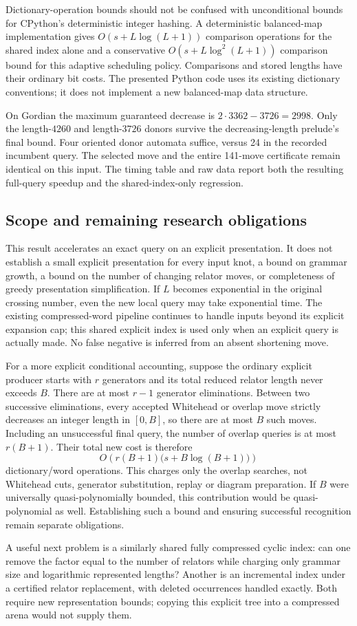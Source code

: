 Dictionary-operation bounds should not be confused with unconditional
bounds for CPython's deterministic integer hashing.  A deterministic
balanced-map implementation gives $O(s+L\log(L+1))$ comparison operations
for the shared index alone and a conservative
$O(s+L\log^2(L+1))$ comparison bound for this adaptive scheduling policy.
Comparisons and stored lengths have their ordinary bit costs.  The
presented Python code uses its existing dictionary conventions; it does
not implement a new balanced-map data structure.

On Gordian the maximum guaranteed decrease is $2\cdot3362-3726=2998$.
Only the length-$4260$ and length-$3726$ donors survive the decreasing-length
prelude's final bound.  Four oriented donor automata suffice, versus 24
in the recorded incumbent query.  The selected move and the entire
141-move certificate remain identical on this input.  The timing table
and raw data report both the resulting full-query speedup and the
shared-index-only regression.

\subsection{Scope and remaining research obligations}

This result accelerates an exact query on an explicit presentation.  It
does not establish a small explicit presentation for every input knot,
a bound on grammar growth, a bound on the number of changing relator
moves, or completeness of greedy presentation simplification.  If $L$
becomes exponential in the original crossing number, even the new local
query may take exponential time.  The existing compressed-word pipeline
continues to handle inputs beyond its explicit expansion cap; this
shared explicit index is used only when an explicit query is actually
made.  No false negative is inferred from an absent shortening move.

For a more explicit conditional accounting, suppose the ordinary explicit
producer starts with $r$ generators and its total reduced relator length
never exceeds $B$.  There are at most $r-1$ generator eliminations.  Between
two successive eliminations, every accepted Whitehead or overlap move
strictly decreases an integer length in $[0,B]$, so there are at most $B$
such moves.  Including an unsuccessful final query, the number of overlap
queries is at most $r(B+1)$.  Their total new cost is therefore
\[
 O\!\left(r(B+1)\bigl(s+B\log(B+1)\bigr)\right)
\]
dictionary/word operations.  This charges only the overlap searches, not
Whitehead cuts, generator substitution, replay or diagram preparation.
If $B$ were universally quasi-polynomially bounded, this contribution
would be quasi-polynomial as well.  Establishing such a bound and ensuring
successful recognition remain separate obligations.

A useful next problem is a similarly shared fully compressed cyclic index:
can one remove the factor equal to the number of relators while charging
only grammar size and logarithmic represented lengths?  Another is an
incremental index under a certified relator replacement, with deleted
occurrences handled exactly.  Both require new representation bounds;
copying this explicit tree into a compressed arena would not supply them.
